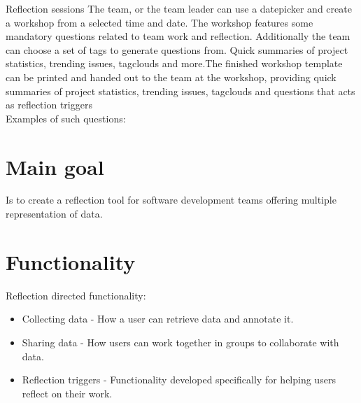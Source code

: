 \begin{description}
	\item {Reflection sessions} 
	The team, or the team leader can use a datepicker and create a workshop from a selected time and date. The workshop features some mandatory questions
	related to team work and reflection. Additionally the team can choose a set of tags to generate questions from. Quick summaries of project statistics, trending issues, tagclouds and more.The finished workshop template can be printed and
	handed out to the team at the workshop, providing quick summaries of project statistics, trending issues, tagclouds and questions that acts as reflection triggers\\
	Examples of such questions: 
\end{description}

\section{Main goal}
Is to create a reflection tool for software development teams offering multiple representation of data. %

\section{Functionality}

Reflection directed functionality:
\begin{itemize}
\item Collecting data - How a user can retrieve data and annotate it. 
\item Sharing data - How users can work together in groups to collaborate with data. 
\item Reflection triggers - Functionality developed specifically for helping users reflect on their work.
\end{itemize}

